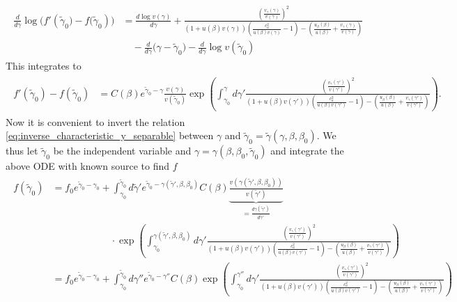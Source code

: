 {\small\begin{align}
\begin{aligned}
\frac{d}{d\gamma}\log\big(f'(\tilde{\gamma}_0\big)-f\big(\tilde{\gamma}_0)\big)&=  \frac{d\log v(\gamma)}{d\gamma} + \frac{\left(\tfrac{v_\gamma(\gamma)}{v(\gamma)}\right)^2}{(1+u(\beta)v(\gamma))\left(\frac{c_a^2}{u(\beta)v(\gamma)}-1\right)-\left(\tfrac{u_\beta(\beta)}{u(\beta)}+\tfrac{v_\gamma(\gamma)}{v(\gamma)}\right)}\\
&\quad -\frac{d}{d\gamma}\big(\gamma-\tilde{\gamma}_0\big)-\frac{d}{d\gamma}\log v(\tilde{\gamma}_0)
\end{aligned}\end{align}}
This integrates to
{\small\begin{align}
\begin{aligned}
    f'(\tilde{\gamma}_0)-f(\tilde{\gamma}_0)&= C(\beta) e^{\tilde{\gamma}_0-\gamma}\frac{v(\gamma)}{v(\tilde{\gamma}_0)}\exp\left(\int^\gamma_{\gamma_0} \!\!\!\!d\gamma' \frac{\left(\tfrac{v_\gamma(\gamma')}{v(\gamma')}\right)^2}{(1\!+\!u(\beta)v(\gamma'))\left(\frac{c_a^2}{u(\beta)v(\gamma')}\!-\!1\right)-\left(\tfrac{u_\beta(\beta)}{u(\beta)}\!+\!\tfrac{v_\gamma(\gamma')}{v(\gamma')}\right)}\right).
\end{aligned}\end{align}}
Now it is convenient to invert the relation \eqref{eq:inverse_characteristic_y_separable} between $\gamma$ and $\tilde{\gamma}_0=\tilde{\gamma}(\gamma,\beta,\beta_0)$.
We thus let $\tilde{\gamma}_0$ be the independent variable and $\gamma=\gamma(\beta,\beta_0,\tilde{\gamma}_0)$ and integrate the above ODE with known source to find $f$
{\small\begin{align}
\begin{aligned}
    f(\tilde{\gamma}_0)&= f_0 e^{\tilde{\gamma}_0-\gamma_0}+ \int^{\tilde{\gamma}_0}_{\gamma_0} \!\!\!d\tilde{\gamma}' e^{\tilde{\gamma}_0-\gamma(\tilde{\gamma}',\beta,\beta_0)} C(\beta) \underbrace{\tfrac{v(\gamma(\tilde{\gamma}',\beta,\beta_0))}{v(\tilde{\gamma}')}}_{=\tfrac{d\gamma(\tilde{\gamma}')}{d\tilde{\gamma}'}}\\
    &\qquad\qquad\qquad\cdot\exp\left(\int^{\gamma(\tilde{\gamma}',\beta,\beta_0)}_{\gamma_0} \!\!\!\!\!d\gamma' \tfrac{\left(\tfrac{v_\gamma(\gamma')}{v(\gamma')}\right)^2}{(1\!+\!u(\beta)v(\gamma'))\left(\frac{c_a^2}{u(\beta)v(\gamma')}-1\right)-\left(\tfrac{u_\beta(\beta)}{u(\beta)}+\tfrac{v_\gamma(\gamma')}{v(\gamma')}\right)}\right)\\
    &=f_0 e^{\tilde{\gamma}_0-\gamma_0} + \int^{\tilde{\gamma}_0}_{\gamma_0}\!\! \!\!\!d\gamma'' e^{\tilde{\gamma}_0-\gamma''} C(\beta) 
    \exp\!\left(\!\int^{\gamma''}_{\gamma_0} \!\!\!\!\!\!\!d\gamma' \tfrac{\left(\tfrac{v_\gamma(\gamma')}{v(\gamma')}\right)^2}{(1\!+\!u(\beta)v(\gamma'))\left(\frac{c_a^2}{u(\beta)v(\gamma')}-1\right)-\left(\tfrac{u_\beta(\beta)}{u(\beta)}+\tfrac{v_\gamma(\gamma')}{v(\gamma')}\right)}\!\right)
\end{aligned}\end{align}}
